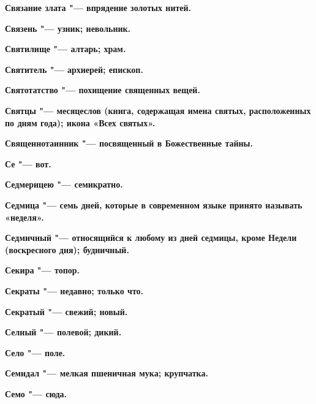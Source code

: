 \begin{mymulticols}{2}
\bfseries Связание злата\normalfont{} "--- впрядение золотых нитей. 




\bfseries Связень\normalfont{} "--- узник; невольник. 




\bfseries Святилище\normalfont{} "--- алтарь; храм. 




\bfseries Святитель\normalfont{} "--- архиерей; епископ. 




\bfseries Святотатство\normalfont{} "--- похищение священных вещей. 




\bfseries Святцы\normalfont{} "--- месяцеслов (книга, содержащая имена святых, расположенных по дням года); икона «Всех святых». 




\bfseries Священнотаинник\normalfont{} "--- посвященный в Божественные тайны. 




\bfseries Се\normalfont{} "--- вот. 




\bfseries Седмерицею\normalfont{} "--- семикратно. 




\bfseries Седмица\normalfont{} "--- семь дней, которые в современном языке принято называть «неделя». 




\bfseries Седмичный\normalfont{} "--- относящийся к любому из дней седмицы, кроме Недели (воскресного дня); будничный. 




\bfseries Секира\normalfont{} "--- топор. 




\bfseries Секраты\normalfont{} "--- недавно; только что. 




\bfseries Секратый\normalfont{} "--- свежий; новый. 




\bfseries Селный\normalfont{} "--- полевой; дикий. 




\bfseries Село\normalfont{} "--- поле. 




\bfseries Семидал\normalfont{} "--- мелкая пшеничная мука; крупчатка. 




\bfseries Семо\normalfont{} "--- сюда. 





\end{mymulticols}
